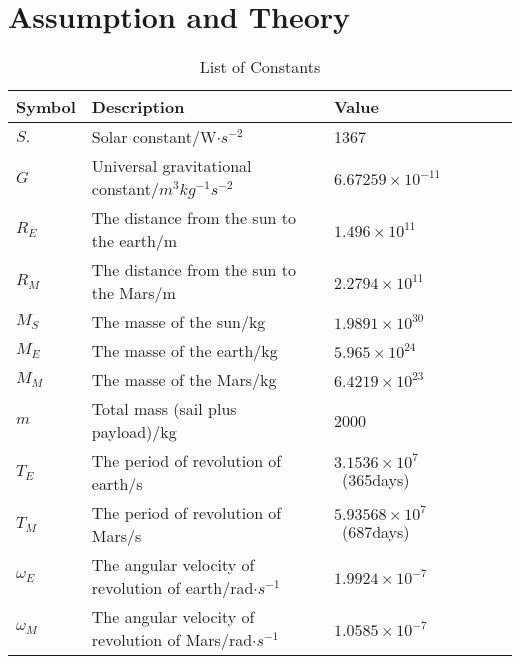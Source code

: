 \documentclass[../Paper.tex]{subfiles}
\begin{document}
\section{Assumption and Theory}

\renewcommand\arraystretch{1.5} %
\begin{table}[H]
\centering
\scriptsize %
\begin{tabular}{p{2cm}<{\centering} p{6.5cm}<{\centering} p{3cm}<{\centering} %
				p{1cm}<{\centering} p{1cm}<{\centering} }
		\hline
Symbol & Description & Value \\
	    \hline
	    \hline
$S.$ & Solar constant/W$\cdot s^{-2}$ & 1367 \\

$G$ & Universal gravitational constant/$m^3kg^{-1}s^{-2}$ & $6.67259\times10^{-11}$ \\

$R_E$ & The distance from the sun to the earth/m & $1.496\times10^{11}$ \\
		
$R_M$ & The distance from the sun to the Mars/m & $2.2794\times10^{11}$ \\

$M_S$ & The masse of the sun/kg & $1.9891\times10^{30}$  \\

$M_E$ & The masse of the earth/kg & $5.965\times10^{24}$  \\

$M_M$ & The masse of the Mars/kg & $6.4219\times10^{23}$  \\

$m$ & Total mass (sail plus payload)/kg & 2000~ \\

$T_E$ & The period of revolution of earth/s & $3.1536\times10^{7}$~(365days) \\

$T_M$ & The period of revolution of Mars/s & $5.93568\times10^{7}$~(687days)\\

$\omega_E$ & The angular velocity of revolution of earth/rad$\cdot s^{-1}$ & $1.9924\times10^{-7}$ \\

$\omega_M$ & The angular velocity of revolution of Mars/rad$\cdot s^{-1}$ & $1.0585\times10^{-7}$ \\
	    \hline
\end{tabular}

\caption{ List of Constants}
\label{Table1}
\end{table}
\end{document}
